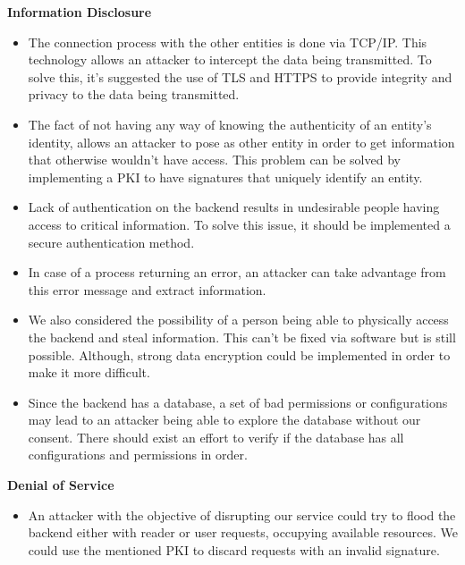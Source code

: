 \textbf{Information Disclosure}
\begin{itemize}
    \item The connection process with the other entities is done via TCP/IP. This technology allows an attacker to intercept the data being transmitted. To solve this, it's suggested the use of TLS\cite{tls} and HTTPS to provide integrity and privacy to the data being transmitted.
    \item The fact of not having any way of knowing the authenticity of an entity's identity, allows an attacker to pose as other entity in order to get information that otherwise wouldn't have access. This problem can be solved by implementing a PKI\cite{pki} to have signatures that uniquely identify an entity.
    \item Lack of authentication on the backend results in undesirable people having access to critical information. To solve this issue, it should be implemented a secure authentication method.
    \item In case of a process returning an error, an attacker can take advantage from this error message and extract information. 
    \item We also considered the possibility of a person being able to physically access the backend and steal information. This can't be fixed via software but is still possible. Although, strong data encryption could be implemented in order to make it more difficult. 
    \item Since the backend has a database, a set of bad permissions or configurations may lead to an attacker being able to explore the database without our consent. There should exist an effort to verify if the database has all configurations and permissions in order.
\end{itemize}

\textbf{Denial of Service}
\begin{itemize}
    \item An attacker with the objective of disrupting our service could try to flood the backend either with reader or user requests, occupying available resources. We could use the mentioned PKI\cite{pki} to discard requests with an invalid signature.
\end{itemize}

